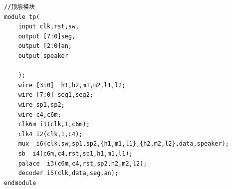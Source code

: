 \documentclass[UTF8]{ctexart}
\begin{document}
\begin{verbatim}
//顶层模块
module tp(
    input clk,rst,sw,
    output [7:0]seg,
    output [2:0]an,
    output speaker

    );
    wire [3:0]  h1,h2,m1,m2,l1,l2;
    wire [7:0] seg1,seg2;
    wire sp1,sp2;
    wire c4,c6m;
    clk6m i1(clk,1,c6m);
    clk4 i2(clk,1,c4);
    mux  i6(clk,sw,sp1,sp2,{h1,m1,l1},{h2,m2,l2},data,speaker);
    sb  i4(c6m,c4,rst,sp1,h1,m1,l1);
    palace  i3(c6m,c4,rst,sp2,h2,m2,l2);
    decoder i5(clk,data,seg,an);
endmodule

\end{verbatim}
\end{document}
